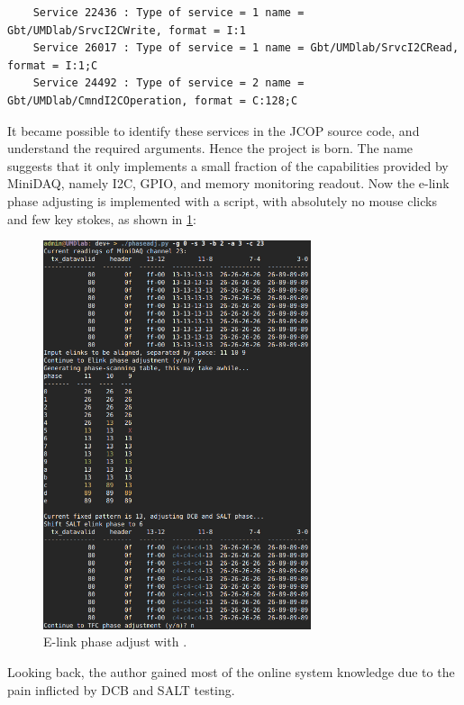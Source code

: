 \begin{lstlisting}
    Service 22436 : Type of service = 1 name = Gbt/UMDlab/SrvcI2CWrite, format = I:1
    Service 26017 : Type of service = 1 name = Gbt/UMDlab/SrvcI2CRead, format = I:1;C
    Service 24492 : Type of service = 2 name = Gbt/UMDlab/CmndI2COperation, format = C:128;C
\end{lstlisting}

It became possible to identify these services in the JCOP source code,
and understand the required arguments.
Hence the \nanoDAQ project \cite{nanoDAQ} is born.
The name suggests that it only implements a small fraction of the capabilities
provided by MiniDAQ, namely I2C, GPIO, and memory monitoring readout.
Now the e-link phase adjusting is implemented with a script, with absolutely no
mouse clicks and few key stokes, as shown in
\cref{fig:nanodaq-phaseadj}:

\begin{figure}[!htb]
    \centering
    \includegraphics[width=0.7\textwidth]{./figs-ut-upgrade/online/elk_phase_adj.png}
    \caption{
        E-link phase adjust with \nanoDAQ.
    }
    \label{fig:nanodaq-phaseadj}
\end{figure}

Looking back, the author gained most of the online system knowledge due to the
pain inflicted by DCB and SALT testing.
